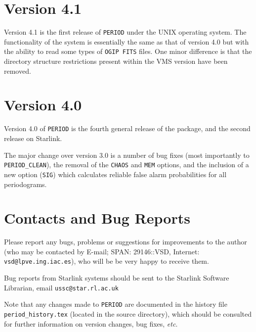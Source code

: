 \section{Version 4.1}

Version 4.1 is the first release of {\tt PERIOD} under the UNIX operating
system.  The functionality of the system is essentially the same as
that of version 4.0 but with the ability to read some types of 
{\tt OGIP FITS} files.  One minor difference is that the directory
structure restrictions present within the VMS version have been
removed.

\section{Version 4.0}

Version 4.0 of {\tt PERIOD} is the fourth general release of the
package, and the second release on Starlink. 

The major change over version 3.0 is a number of bug fixes (most
importantly to {\tt PERIOD\_CLEAN}), the removal of the {\tt CHAOS} and
{\tt MEM} options, and the inclusion of a new option ({\tt SIG}) which
calculates reliable false alarm probabilities for all periodograms.

\section{Contacts and Bug Reports}

Please report any bugs, problems or suggestions for improvements to the
author (who may be contacted by E-mail; SPAN: 29146::VSD, Internet: {\tt
vsd@lpve.ing.iac.es}), who will be be very happy to receive them.

Bug reports from Starlink systems should be sent to the Starlink
Software Librarian, email {\tt ussc@star.rl.ac.uk}

Note that any changes made to {\tt PERIOD} are documented in the
history file {\tt period\_history.tex} (located in the source
directory), which should be consulted for further information on
version changes, bug fixes, {\em etc}.


